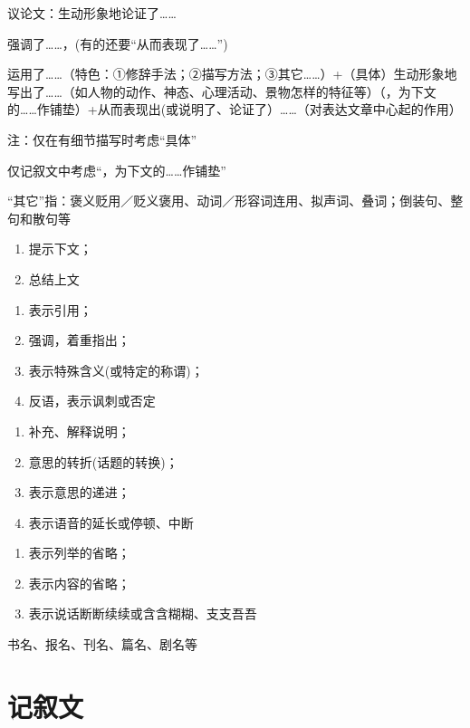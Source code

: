 议论文：生动形象地论证了\ldots{}\ldots{}

强调了\ldots{}\ldots{}，(有的还要``从而表现了\ldots{}\ldots{}'')

运用了\ldots{}\ldots{}（特色：①修辞手法；②描写方法；③其它\ldots{}\ldots{}）+（具体）生动形象地写出了\ldots{}\ldots{}（如人物的动作、神态、心理活动、景物怎样的特征等）（，为下文的\ldots{}\ldots{}作铺垫）+从而表现出(或说明了、论证了）\ldots{}\ldots{}（对表达文章中心起的作用）

注：仅在有细节描写时考虑``具体''

仅记叙文中考虑``，为下文的\ldots{}\ldots{}作铺垫''

``其它''指：褒义贬用／贬义褒用、动词／形容词连用、拟声词、叠词；倒装句、整句和散句等

\begin{enumerate}
\item 提示下文；
\item 总结上文
\end{enumerate}

\begin{enumerate}
\item 表示引用；
\item 强调，着重指出；
\item 表示特殊含义(或特定的称谓)；
\item 反语，表示讽刺或否定
\end{enumerate}

\begin{enumerate}
\item 补充、解释说明；
\item 意思的转折(话题的转换)；
\item 表示意思的递进；
\item 表示语音的延长或停顿、中断
\end{enumerate}

\begin{enumerate}
\item 表示列举的省略；
\item 表示内容的省略；
\item 表示说话断断续续或含含糊糊、支支吾吾
\end{enumerate}

书名、报名、刊名、篇名、剧名等

\section{记叙文}

